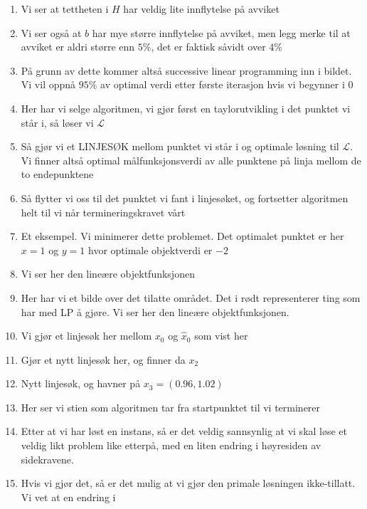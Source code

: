 \documentclass[a4paper,twocolumn]{report}
\begin{document}
\begin{enumerate}
\item Vi ser at tettheten i $H$ har veldig lite innflytelse på avviket
\item Vi ser også at $b$ har mye større innflytelse på avviket, men legg
      merke til at avviket er aldri større enn $5\%$, det er faktisk såvidt
      over $4\%$
\item På grunn av dette kommer altså successive linear programming inn i
      bildet. Vi vil oppnå $95\%$ av optimal verdi etter første iterasjon
      hvis vi begynner i $0$
\item Her har vi selge algoritmen, vi gjør først en taylorutvikling i det
      punktet vi står i, så løser vi $\mathcal{L}$
\item Så gjør vi et LINJESØK mellom punktet vi står i og optimale løsning til
      $\mathcal{L}$. Vi finner altså optimal målfunksjonsverdi av alle punktene
      på linja mellom de to endepunktene
\item Så flytter vi oss til det punktet vi fant i linjesøket, og fortsetter
      algoritmen helt til vi når termineringskravet vårt
\item Et eksempel. Vi minimerer dette problemet. Det optimalet punktet er her
      $x = 1$ og $y = 1$ hvor optimale objektverdi er $-2$
\item Vi ser her den lineære objektfunksjonen
\item Her har vi et bilde over det tilatte området. Det i rødt representerer
      ting som har med LP å gjøre. Vi ser her den lineære objektfunksjonen.
\item Vi gjør et linjesøk her mellom $x_0$ og $\hat{x}_0$ som vist her
\item Gjør et nytt linjesøk her, og finner da $x_2$
\item Nytt linjesøk, og havner på $x_3 = (0.96,1.02)$
\item Her ser vi stien som algoritmen tar fra startpunktet til vi terminerer
\item Etter at vi har løst en instans, så er det veldig sannsynlig at vi skal
      løse et veldig likt problem like etterpå, med en liten endring i
      høyresiden av sidekravene.
\item Hvis vi gjør det, så er det mulig at vi gjør den primale løsningen
      ikke-tillatt. Vi vet at en endring i 
\end{enumerate}
\end{document}

